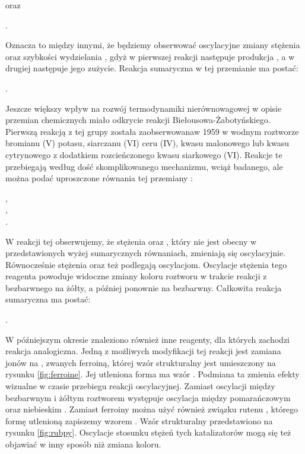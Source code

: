 \documentclass[10pt, a4paper, twoside, onecolumn]{article}
\numberwithin{equation}{section}
\begin{document}
	\begin{center}
	\end{center}
	oraz
	\begin{center}
		.
	\end{center}
	Oznacza to między innymi, że będziemy obserwować oscylacyjne zmiany stężenia  oraz szybkości wydzielania , gdyż w pierwszej reakcji następuje produkcja , a w drugiej następuje jego zużycie. Reakcja sumaryczna w tej przemianie ma postać: 
	\begin{center}
		.
	\end{center}
	
	Jeszcze większy wpływ na rozwój termodynamiki nierównowagowej w opisie przemian chemicznych miało odkrycie reakcji Biełousowa-Żabotyńskiego. Pierwszą reakcją z tej grupy została zaobserwowanaw 1959 w wodnym roztworze bromianu (V) potasu, siarczanu (VI) ceru (IV), kwasu malonowego lub kwasu cytrynowego z dodatkiem rozcieńczonego kwasu siarkowego (VI). Reakcje te przebiegają według dość skomplikowanego mechanizmu, wciąż badanego, ale można podać uproszczone równania tej przemiany \cite{orlik}: %
	\begin{center}
		, \\
		, \\
		.
	\end{center}
	W reakcji tej obserwujemy, że stężenia  oraz , który nie jest obecny w przedstawionych wyżej sumarycznych równaniach, zmieniają się oscylacyjnie. Równocześnie stężenia  oraz  też podlegają oscylacjom. Oscylacje stężenia tego reagenta powoduje widoczne zmiany koloru roztworu w trakcie reakcji z bezbarwnego na żółty, a później ponownie na bezbarwny. Całkowita reakcja sumaryczna ma postać: 
	\begin{center}
		.
	\end{center}
	W późniejszym okresie znaleziono również inne reagenty, dla których zachodzi reakcja analogiczna. Jedną z możliwych modyfikacji tej reakcji jest zamiana jonów  na , zwanych ferroiną, której wzór strukturalny jest umieszczony na rysunku \ref{fig:ferroine}. Jej utleniona forma ma wzór . Podmiana ta zmienia efekty wizualne w czasie przebiegu reakcji oscylacyjnej. Zamiast oscylacji między bezbarwnym i żółtym roztworem występuje oscylacja między pomarańczowym oraz niebieskim \cite{orlik}. Zamiast ferroiny można użyć również związku rutenu , którego formę utlenioną zapiszemy wzorem . Wzór strukturalny  przedstawiono na rysunku \ref{fig:rubpy}. Oscylacje stosunku stężeń tych katalizatorów mogą się też objawiać w inny sposób niż zmiana koloru. \cite{osypova}\par
\end{document}
